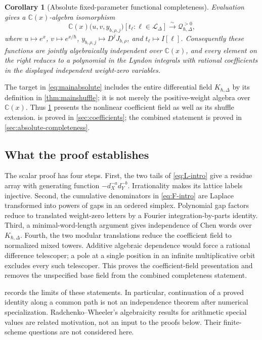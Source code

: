 \documentclass[11pt]{article}
\numberwithin{equation}{section}
\newtheorem{corollary}[corollary]{Corollary}
\theoremstyle{definition}
\theoremstyle{remark}
\newcommand{\C}{\mathbb C}
\newcommand{\calQ}{\mathcal Q}
\newcommand{\qh}{\hbar}
\begin{document}
\begin{corollary}[Absolute fixed-parameter functional completeness]
\label{cor:mainabsolute}
Evaluation gives a $\C(x)$-algebra isomorphism
\begin{equation}\label{eq:mainabsolute}
 \C(x)\bigl(u,v,y_{b,\rho,j}\bigr)
       [t_\ell:\ell\in\mathscr L_\Delta]
 \xrightarrow{\sim}\calQ_{\qh,\Delta}^{>0},
\end{equation}
where $u\mapsto e^x$, $v\mapsto e^{x/\qh}$,
$y_{b,\rho,j}\mapsto D^jJ_{b,\rho}$, and $t_\ell\mapsto I[\ell]$.
Consequently these functions are jointly algebraically independent over
$\C(x)$, and every element on the right reduces to a polynomial in the
Lyndon integrals with rational coefficients in the displayed independent
weight-zero variables.
\end{corollary}

The target in \eqref{eq:mainabsolute} includes the entire differential field
$K_{\qh,\Delta}$ by its definition in \cref{thm:mainshuffle}; it is not merely
the positive-weight algebra over $\C(x)$. Thus \cref{cor:mainabsolute}
presents the nonlinear coefficient field as well as its shuffle extension.
 is proved in \cref{sec:coefficients}; the combined
statement is proved in \cref{sec:absolute-completeness}.

\subsection{What the proof establishes}

The scalar proof has four steps. First, the two tails of
\eqref{eq:L-intro} give a residue array with generating function
$-d_X^{-a}d_Y^{-b}$. Irrationality makes its lattice labels injective. Second,
the cumulative denominators in \eqref{eq:F-intro} are Laplace transformed into
powers of gaps in an ordered simplex. Polynomial gap factors reduce to
translated weight-zero letters by a Fourier integration-by-parts identity.
Third, a minimal-word-length argument gives independence of Chen words over
$K_{\qh,\Delta}$. Fourth, the two modular translations reduce the coefficient
field to normalized mixed towers. Additive algebraic dependence would force
a rational difference telescoper; a pole at a single position in an infinite
multiplicative orbit excludes every such telescoper. This proves the
coefficient-field presentation and removes the unspecified base field from
the combined completeness statement.

 records the limits of these statements. In particular,
continuation of a proved identity along a common path is not an independence
theorem after numerical specialization. Radchenko--Wheeler's algebraicity
results for arithmetic special values \cite{RadchenkoWheeler2026} are related
motivation, not an input to the proofs below. Their finite-scheme questions
are not considered here.
\end{document}
